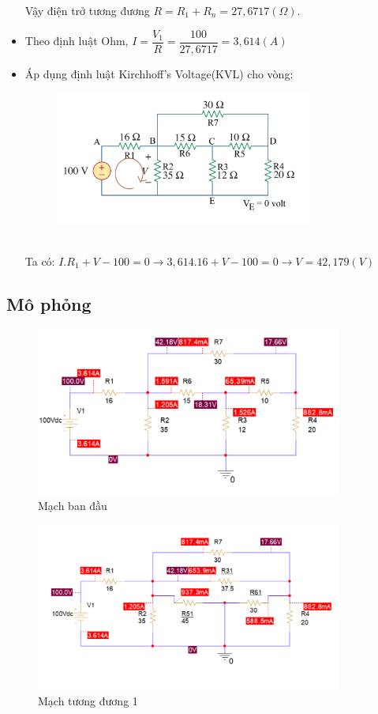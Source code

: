 \begin{itemize}
        Vậy điện trở tương đương \(R = R_1 + R_n = 27,6717 (\Omega)\).
    \item Theo định luật Ohm, \(I = \dfrac{V_1}{R} = \dfrac{100}{27,6717} = 3,614 (A)\)
    \pagebreak
    \item {Áp dụng định luật Kirchhoff's Voltage(KVL) cho vòng:
    \begin{figure}[!htbp]
        \centering
        \includegraphics[width=0.8\textwidth]{graphics/ex10/f10.png}
        \end{figure}\\
        Ta có: \(I.R_1 + V - 100 = 0 \rightarrow 3,614.16 + V -100 = 0 \rightarrow V = 42,179 (V)\)}
\end{itemize}
\subsection{Mô phỏng}
\begin{figure}[!htbp]
    \centering
    \includegraphics[width=0.9\textwidth]{graphics/ex10/f6.png}
    \caption{Mạch ban đầu}
\end{figure}
    \begin{figure}[!htbp]
        \centering
        \includegraphics[width=0.9\textwidth]{graphics/ex10/f7.png}
        \caption{Mạch tương đương 1}
    \end{figure}

